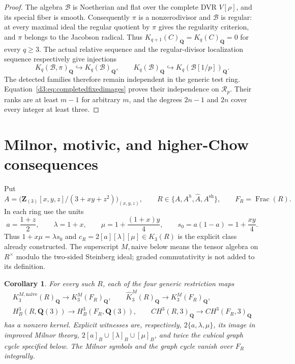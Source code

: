 \documentclass[11pt,a4paper]{amsart}
\numberwithin{equation}{section}
\newtheorem{corollary}[theorem]{Corollary}
\theoremstyle{definition}
\theoremstyle{remark}
\newcommand{\Q}{\mathbf Q}
\begin{document}
\begin{proof}
The algebra $\mathcal B$ is Noetherian and flat over the complete
DVR $V[\rho]$, and its special fiber is smooth.
Consequently $\pi$ is a nonzerodivisor and $\mathcal B$ is regular:
at every maximal ideal the regular quotient by $\pi$ gives the
regularity criterion, and $\pi$ belongs to the Jacobson radical.
Thus $K_{q+1}(C)_{\Q}=K_q(C)_{\Q}=0$ for every $q\geq3$.
The actual relative sequence and the regular-divisor
localization sequence respectively give injections
\[
 K_q(\mathcal B,\pi)_{\Q}\hookrightarrow K_q(\mathcal B)_{\Q},
 \qquad
 K_q(\mathcal B)_{\Q}\hookrightarrow
                     K_q(\mathcal B[1/p])_{\Q}.
\]
The detected families therefore remain independent in the
generic test ring. Equation~\eqref{d3:eq:completedfixedimages}
proves their independence on $\mathcal R_p$.
Their ranks are at least $m-1$ for arbitrary $m$, and the
degrees $2n-1$ and $2n$ cover every integer at least three.
\end{proof}


\section{Milnor, motivic, and higher-Chow consequences}
\label{d3:sec:milnormotivicconsequences}

Put
\[
 A=\bigl(\mathbf Z_{(3)}[x,y,z]/(3+xy+z^2)\bigr)_{(x,y,z)},
 \qquad R\in\{A,A^h,\widehat A,A^{\mathrm{sh}}\},
 \qquad F_R=\operatorname{Frac}(R).
\]
In each ring use the units
\[
 a=\frac{1+z}{2},\qquad \lambda=1+x,\qquad
 \mu=1+\frac{(1+x)y}{4},\qquad
 s_0=a(1-a)=1+\frac{xy}{4}.
\]
Thus $1+x\mu=\lambda s_0$ and
$c_R=2[a][\lambda][\mu]\in K_3(R)$ is the explicit class already
constructed. The superscript $M,\mathrm{naive}$ below means the
tensor algebra on $R^\times$ modulo the two-sided Steinberg ideal;
graded commutativity is not added to its definition.

\begin{corollary}\label{d3:cor:explicitmilnormotivic}
For every such $R$, each of the four generic restriction maps
\[
\begin{gathered}
 K_3^{M,\mathrm{naive}}(R)_{\mathbf Q}
       \longrightarrow K_3^M(F_R)_{\mathbf Q},\qquad
 \widehat K_3^M(R)_{\mathbf Q}
       \longrightarrow K_3^M(F_R)_{\mathbf Q},\\
 H_B^3(R,\mathbf Q(3))\longrightarrow H_B^3(F_R,\mathbf Q(3)),
 \qquad
 CH^3(R,3)_{\mathbf Q}\longrightarrow CH^3(F_R,3)_{\mathbf Q}
\end{gathered}
\]
has a nonzero kernel. Explicit witnesses are, respectively,
$2\{a,\lambda,\mu\}$, its image in improved Milnor theory,
$2[a]_B\cup[\lambda]_B\cup[\mu]_B$, and twice the cubical graph
cycle specified below. The Milnor symbols and the graph cycle vanish
over $F_R$ integrally.
\end{corollary}
\end{document}
